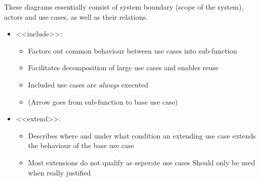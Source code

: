 \documentclass[
../../Software_Engineering_Summary.tex,
]
{subfiles}
\begin{document}
These diagrams essentially consist of system boundary (scope of the system), actors and use cases, as well as their relations.

\begin{greenbox}
    \begin{itemize}
        \item <<include>>:
        \begin{itemize}
            \item Factors out common behaviour between use cases into sub-function
            \item Facilitates decomposition of large use cases and enables reuse
            \item Included use cases are \textit{always} executed
            \item (Arrow goes from sub-function to base use case)
        \end{itemize}
        \item <<extend>>:
        \begin{itemize}
            \item Describes where and under what condition an extending use case extends the behaviour of the base use case
            \item Most extensions do not qualify as seperate use cases \rightarrow Should only be used when really justified
        \end{itemize}
    \end{itemize}
\end{greenbox}
\end{document}
